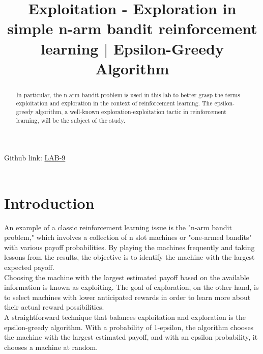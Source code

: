 \documentclass[conference]{IEEEtran}
\begin{document}
\title{Exploitation - Exploration in simple n-arm
bandit reinforcement learning $|$ Epsilon-Greedy Algorithm}
\author{
\and
{}
\and
{}
\and
{}
}
\maketitle
\setlength{\parindent}{20pt}
\noindent Github link: \href{https://github.com/JARVIS-codebase/LAB-5}{LAB-9} \\ \\ 
\indent \begin{abstract}
In particular, the n-arm bandit problem is used in this lab to better grasp the terms exploitation and exploration in the context of reinforcement learning. The epsilon-greedy algorithm, a well-known exploration-exploitation tactic in reinforcement learning, will be the subject of the study.
\end{abstract}
\IEEEpeerreviewmaketitle

\section{Introduction}
An example of a classic reinforcement learning issue is the "n-arm bandit problem," which involves a collection of n slot machines or "one-armed bandits" with various payoff probabilities. By playing the machines frequently and taking lessons from the results, the objective is to identify the machine with the largest expected payoff.\\
Choosing the machine with the largest estimated payoff based on the available information is known as exploiting. The goal of exploration, on the other hand, is to select machines with lower anticipated rewards in order to learn more about their actual reward possibilities. \\
A straightforward technique that balances exploitation and exploration is the epsilon-greedy algorithm. With a probability of 1-epsilon, the algorithm chooses the machine with the largest estimated payoff, and with an epsilon probability, it chooses a machine at random.
\end{document}
